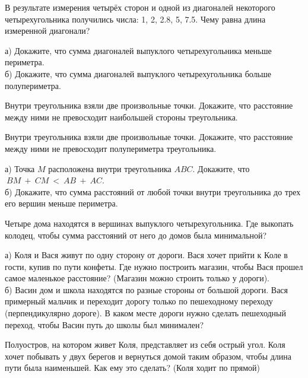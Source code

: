 \begin{problems}
 
\item В результате измерения четырёх сторон и одной из диагоналей некоторого четырехугольника получились числа: 1, 2, 2.8, 5, 7.5.
Чему равна длина измеренной диагонали?

\item а) Докажите, что сумма диагоналей выпуклого четырехугольника меньше периметра.\\
б) Докажите, что сумма диагоналей выпуклого четырехугольника больше полупериметра.

\item Внутри треугольника взяли две произвольные точки. Докажите, что расстояние между ними не превосходит наибольшей стороны треугольника.

\item Внутри треугольника взяли две произвольные точки. Докажите, что расстояние между ними не превосходит полупериметра треугольника. 

\item а) Точка $M$ расположена внутри треугольника $ABC$. Докажите, что \\ $~BM~+~CM~<~AB~+~AC$. \\
б) Докажите, что сумма расстояний от любой точки внутри треугольника до трех его вершин меньше периметра.

\item Четыре дома находятся в вершинах выпуклого четырехугольника. Где выкопать колодец, чтобы сумма расстояний от него до домов была минимальной? 

\item а) Коля и Вася живут по одну сторону от дороги. Вася хочет прийти к Коле в гости, купив по пути конфеты. Где нужно построить магазин, чтобы Вася прошел самое маленькое расстояние? (Магазин можно строить только у дороги).\\
б) Васин дом и школа находятся по разные стороны от большой дороги. Вася примерный мальчик и переходит дорогу только по пешеходному переходу (перпендикулярно дороге). В каком месте дороги нужно сделать пешеходный переход, чтобы Васин путь до школы был минимален?

\item Полуостров, на котором живет Коля, представляет из себя острый угол. Коля хочет побывать у двух берегов и вернуться домой таким образом, чтобы длина пути была наименьшей. Как ему это сделать? (Коля ходит по прямой)


\end{problems}
